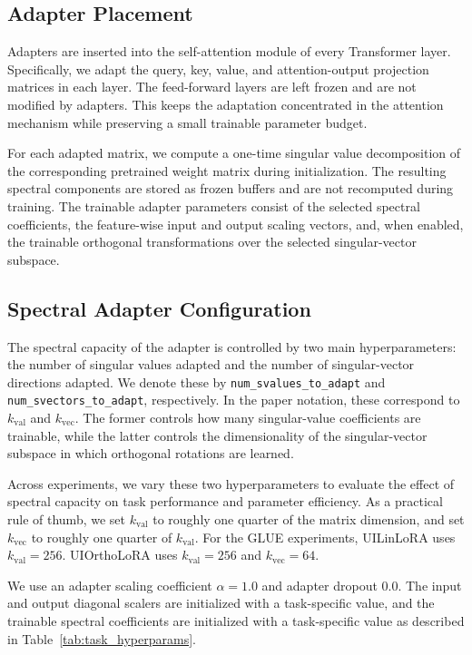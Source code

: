 \subsection{Adapter Placement}

Adapters are inserted into the self-attention module of every Transformer layer. Specifically, we adapt the query, key, value, and attention-output projection matrices in each layer. The feed-forward layers are left frozen and are not modified by adapters. This keeps the adaptation concentrated in the attention mechanism while preserving a small trainable parameter budget.

For each adapted matrix, we compute a one-time singular value decomposition of the corresponding pretrained weight matrix during initialization. The resulting spectral components are stored as frozen buffers and are not recomputed during training. The trainable adapter parameters consist of the selected spectral coefficients, the feature-wise input and output scaling vectors, and, when enabled, the trainable orthogonal transformations over the selected singular-vector subspace.

\subsection{Spectral Adapter Configuration}

The spectral capacity of the adapter is controlled by two main hyperparameters:
the number of singular values adapted and the number of singular-vector
directions adapted. We denote these by
\texttt{num\_svalues\_to\_adapt} and
\texttt{num\_svectors\_to\_adapt}, respectively. In the paper notation, these
correspond to \(k_{\mathrm{val}}\) and \(k_{\mathrm{vec}}\). The former controls
how many singular-value coefficients are trainable, while the latter controls
the dimensionality of the singular-vector subspace in which orthogonal rotations
are learned.

Across experiments, we vary these two hyperparameters to evaluate the effect of
spectral capacity on task performance and parameter efficiency. As a practical
rule of thumb, we set \(k_{\mathrm{val}}\) to roughly one quarter of the matrix
dimension, and set \(k_{\mathrm{vec}}\) to roughly one quarter of
\(k_{\mathrm{val}}\). For the GLUE experiments, UILinLoRA uses
\(k_{\mathrm{val}}=256\). UIOrthoLoRA uses \(k_{\mathrm{val}}=256\) and
\(k_{\mathrm{vec}}=64\).

We use an adapter scaling coefficient
\(\alpha = 1.0\) and adapter dropout \(0.0\). The input and output diagonal
scalers are initialized with a task-specific value, and the trainable spectral
coefficients are initialized with a task-specific value as described in
Table~\ref{tab:task_hyperparams}.

